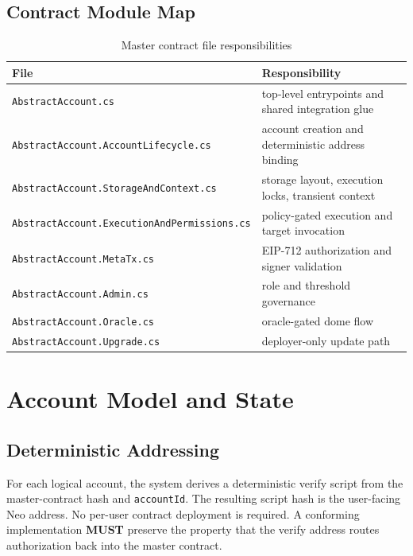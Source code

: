 \documentclass[11pt]{article}
\newcommand{\code}[1]{\texttt{#1}}
\newcommand{\must}{\textbf{MUST}}
\begin{document}
\subsection{Contract Module Map}
\begin{table}[h!]
  \centering
  \caption{Master contract file responsibilities}
  \begin{tabularx}{\textwidth}{>{\raggedright\arraybackslash}p{}X}
    \toprule
    File & Responsibility \\
    \midrule
    \code{AbstractAccount.cs} & top-level entrypoints and shared integration glue \\
    \code{AbstractAccount.AccountLifecycle.cs} & account creation and deterministic address binding \\
    \code{AbstractAccount.StorageAndContext.cs} & storage layout, execution locks, transient context \\
    \code{AbstractAccount.ExecutionAndPermissions.cs} & policy-gated execution and target invocation \\
    \code{AbstractAccount.MetaTx.cs} & EIP-712 authorization and signer validation \\
    \code{AbstractAccount.Admin.cs} & role and threshold governance \\
    \code{AbstractAccount.Oracle.cs} & oracle-gated dome flow \\
    \code{AbstractAccount.Upgrade.cs} & deployer-only update path \\
    \bottomrule
  \end{tabularx}
\end{table}

\section{Account Model and State}
\subsection{Deterministic Addressing}
For each logical account, the system derives a deterministic verify script from the master-contract hash and \code{accountId}. The resulting script hash is the user-facing Neo address. No per-user contract deployment is required. A conforming implementation \must{} preserve the property that the verify address routes authorization back into the master contract.
\end{document}
